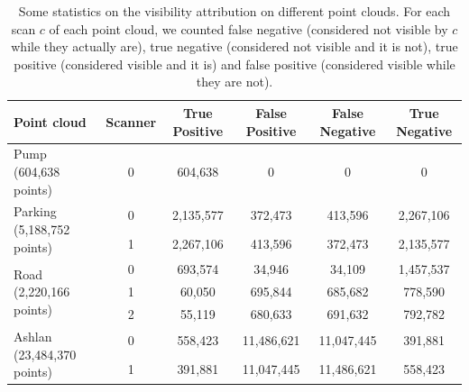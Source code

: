 \begin{table}[]
  \centering
\begin{tabular}{l|c|c|c|c|c}
Point cloud                                 & Scanner & True Positive & False Positive & False Negative & True Negative \\\hline
Pump (604,638 points)                       & 0       & 604,638       & 0              & 0              & 0             \\\hline
\multirow{2}{*}{Parking (5,188,752 points)} & 0       & 2,135,577     & 372,473        & 413,596        & 2,267,106     \\
                                            & 1       & 2,267,106     & 413,596        & 372,473        & 2,135,577     \\\hline
\multirow{3}{*}{Road (2,220,166 points)}    & 0       & 693,574       & 34,946         & 34,109         & 1,457,537     \\
                                            & 1       & 60,050        & 695,844        & 685,682        & 778,590       \\
                                            & 2       & 55,119        & 680,633        & 691,632        & 792,782       \\\hline
\multirow{2}{*}{Ashlan (23,484,370 points)} & 0       & 558,423       & 11,486,621     & 11,047,445     & 391,881       \\
                                            & 1       & 391,881       & 11,047,445     & 11,486,621     & 558,423
\end{tabular}
  \caption{Some statistics on the visibility attribution on different point clouds. For each scan $c$ of each point cloud, we counted false negative (considered not visible by $c$ while they actually are), true negative (considered not visible and it is not), true positive (considered visible and it is) and false positive (considered visible while they are not).}
  \label{table:counts}
\end{table}


